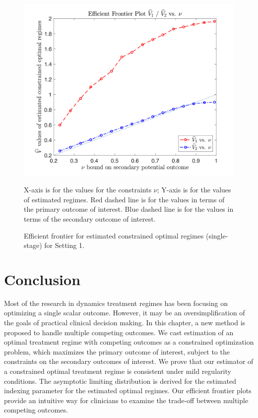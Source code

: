 \documentclass{article}
\begin{document}
\begin{figure}[!htbp]
	\centering
	\includegraphics[width=.9\linewidth]{./figs/efficient_plot1.png}
	\caption{Efficient frontier for estimated constrained optimal regimes (single-stage) for Setting 1.}
	\label{fig:1}
\justify
X-axis is for the values for the constraints $\nu$; Y-axis is for the values of estimated regimes. Red dashed line is for the values in terms of the primary outcome of interest. Blue dashed line is for the values in terms of the secondary outcome of interest.
\end{figure}


\section{Conclusion}
Most of the research in dynamics treatment regimes has been focusing on optimizing a single scalar outcome. However, it may be an oversimplification of the goals of practical clinical decision making. In this chapter, a new method is proposed to handle multiple competing outcomes. We cast estimation of an optimal treatment regime with competing outcomes as a constrained optimization problem, which maximizes the primary outcome of interest, subject to the constraints on the secondary outcomes of interest. We prove that our estimator of a constrained optimal treatment regime is consistent under mild regularity conditions. The asymptotic limiting distribution is derived for the estimated indexing parameter for the estimated optimal regimes. Our efficient frontier plots provide an intuitive way for clinicians to examine the trade-off between multiple competing outcomes. 
\end{document}
